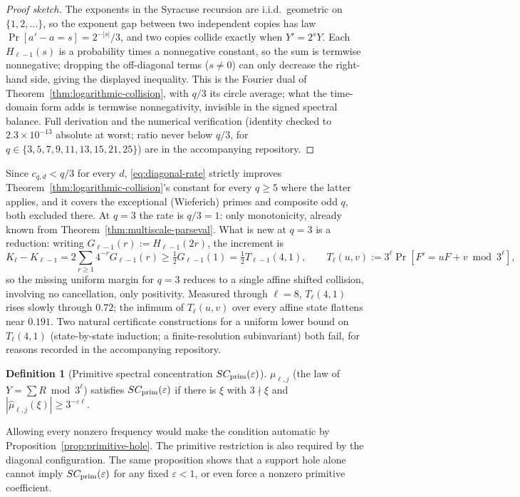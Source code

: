 \documentclass[11pt]{article}
\theoremstyle{definition}
\newtheorem{definition}[theorem]{Definition}
\theoremstyle{remark}
\begin{document}
\begin{proof}[Proof sketch]
The exponents in the Syracuse recursion are i.i.d.\ geometric on
$\{1,2,\ldots\}$, so the exponent gap between two independent copies has
law $\Pr[a'-a=s]=2^{-|s|}/3$, and two copies collide exactly when
$Y'=2^sY$. Each $H_{\ell-1}(s)$ is a probability times a nonnegative
constant, so the sum is termwise nonnegative; dropping the off-diagonal
terms ($s\ne0$) can only decrease the right-hand side, giving the
displayed inequality. This is the Fourier dual of
Theorem~\ref{thm:logarithmic-collision}, with $q/3$ its circle average;
what the time-domain form adds is termwise nonnegativity, invisible in
the signed spectral balance. Full derivation and the numerical
verification (identity checked to $2.3\times10^{-13}$ absolute at
worst; ratio never below
$q/3$, for $q\in\{3,5,7,9,11,13,15,21,25\}$) are in the accompanying
repository.
\end{proof}

Since $c_{q,d}<q/3$ for every $d$, \eqref{eq:diagonal-rate} strictly
improves Theorem~\ref{thm:logarithmic-collision}'s constant for every
$q\ge5$ where the latter applies, and it covers the exceptional
(Wieferich) primes and composite odd $q$, both excluded there. At
$q=3$ the rate is $q/3=1$: only monotonicity, already known from
Theorem~\ref{thm:multiscale-parseval}. What is new at $q=3$ is a
reduction: writing $G_{\ell-1}(r):=H_{\ell-1}(2r)$, the increment is
\[
 K_\ell-K_{\ell-1}=2\sum_{r\ge1}4^{-r}G_{\ell-1}(r)
 \ge\tfrac12G_{\ell-1}(1)=\tfrac12T_{\ell-1}(4,1),
 \qquad
 T_\ell(u,v):=3^\ell\Pr[F'=uF+v\bmod3^\ell],
\]
so the missing uniform margin for $q=3$ reduces to a single affine
shifted collision, involving no cancellation, only positivity. Measured
through $\ell=8$, $T_\ell(4,1)$ rises slowly through $0.72$; the
infimum of $T_\ell(u,v)$ over every affine state flattens near $0.191$.
Two natural certificate constructions for a uniform lower bound on
$T_\ell(4,1)$ (state-by-state induction; a finite-resolution
subinvariant) both fail, for reasons recorded in the accompanying
repository.

\begin{definition}[Primitive spectral concentration
$SC_{\rm prim}(\varepsilon)$]
$\mu_{\ell,j}$ (the law of $Y=\sum R\bmod 3^\ell$) satisfies
$SC_{\rm prim}(\varepsilon)$ if there is $\xi$ with $3\nmid\xi$ and
$|\hat\mu_{\ell,j}(\xi)|\ge 3^{-\varepsilon\ell}$.
\end{definition}

Allowing every nonzero frequency would make the condition automatic by
Proposition~\ref{prop:primitive-hole}. The primitive restriction is also
required by the diagonal configuration. The same proposition shows
that a support hole alone cannot imply $SC_{\rm prim}(\varepsilon)$ for
any fixed $\varepsilon<1$, or even force a nonzero primitive
coefficient.
\end{document}
